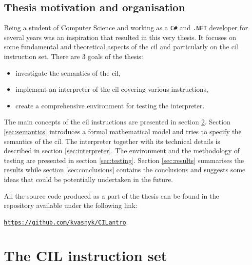 \documentclass[declaration,shortabstract,english,mgr]{iithesis}
\begin{document}
\section{Thesis motivation and organisation}

Being a student of Computer Science and working as a \texttt{C\#} and \texttt{.NET} developer for several years was an inspiration that resulted in this very thesis. It focuses on some fundamental and theoretical aspects of the \acrshort{cil} and particularly on the \acrshort{cil} instruction set. There are 3 goals of the thesis:
\begin{itemize}
	\item{investigate the semantics of the \acrshort{cil},}
	\item{implement an interpreter of the \acrshort{cil} covering various instructions,}
	\item{create a comprehensive environment for testing the interpreter.}
\end{itemize}

The main concepts of the \acrshort{cil} instructions are presented in section \ref{sec:instructionSet}. Section \ref{sec:semantics} introduces a formal mathematical model and tries to specify the semantics of the \acrshort{cil}. The interpreter together with its technical details is described in section \ref{sec:interpreter}. The environment and the methodology of testing are presented in section \ref{sec:testing}. Section \ref{sec:results} summarises the results while section \ref{sec:conclusions} contains the conclusions and suggests some ideas that could be potentially undertaken in the future.

All the source code produced as a part of the thesis can be found in the repository available under the following link:
\begin{center}
	\href{https://github.com/kvasnyk/CILantro}{\texttt{https://github.com/kvasnyk/CILantro}}.
\end{center}

\clearpage


\chapter{The CIL instruction set}
\label{sec:instructionSet}
\end{document}
